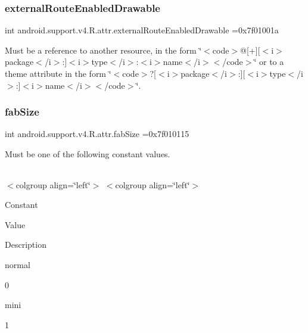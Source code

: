 \subsubsection{\texorpdfstring{external\+Route\+Enabled\+Drawable}{externalRouteEnabledDrawable}}
{\footnotesize\ttfamily int android.\+support.\+v4.\+R.\+attr.\+external\+Route\+Enabled\+Drawable =0x7f01001a\hspace{0.3cm}{\ttfamily [static]}}

Must be a reference to another resource, in the form \char`\"{}$<$code$>$@\mbox{[}+\mbox{]}\mbox{[}$<$i$>$package$<$/i$>$\+:\mbox{]}$<$i$>$type$<$/i$>$\+:$<$i$>$name$<$/i$>$$<$/code$>$\char`\"{} or to a theme attribute in the form \char`\"{}$<$code$>$?\mbox{[}$<$i$>$package$<$/i$>$\+:\mbox{]}\mbox{[}$<$i$>$type$<$/i$>$\+:\mbox{]}$<$i$>$name$<$/i$>$$<$/code$>$\char`\"{}. \mbox{\label{classandroid_1_1support_1_1v4_1_1R_1_1attr_a2f96544f9044e6ee88ee775bc42fae22}} 
\subsubsection{\texorpdfstring{fab\+Size}{fabSize}}
{\footnotesize\ttfamily int android.\+support.\+v4.\+R.\+attr.\+fab\+Size =0x7f010115\hspace{0.3cm}{\ttfamily [static]}}

Must be one of the following constant values.

\tabulinesep=1mm
\begin{longtabu} spread 0pt [c]{*{0}{|X[-1]}|}
\hline
\end{longtabu}
$<$colgroup align=\char`\"{}left\char`\"{}$>$ $<$colgroup align=\char`\"{}left\char`\"{}$>$ 

Constant

Value

Description 

{\ttfamily normal}

0

{\ttfamily mini}

1\mbox{\label{classandroid_1_1support_1_1v4_1_1R_1_1attr_a663fcdc23331956da2a2e08118e3d258}} 
